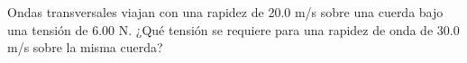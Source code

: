 \item Ondas transversales viajan con una rapidez de 20.0 m/s sobre una cuerda bajo una tensión de 6.00 N. ¿Qué tensión se requiere para una rapidez de onda de 30.0 m/s sobre la misma cuerda?